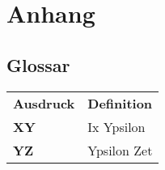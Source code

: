 %
%


\appendix
\chapter{Anhang}\label{chap.anhang}
\section{Glossar}\label{sec.glossar}
\begin{table}[ht] \centering
	\begin{longtable}{m{4cm} m{11cm} }	
		\rowcolor{gray} 
		
		\textbf{Ausdruck} & \textbf{Definition} \\ 
		\textbf{XY} & Ix Ypsilon \\ 
		\textbf{YZ} & Ypsilon Zet \\ 
	
	\end{longtable}
	\label{tab:smKlassifiaktion2}
\end{table}


